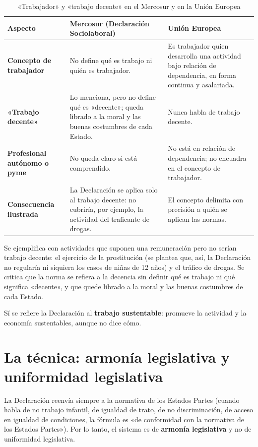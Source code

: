 \documentclass[12pt,oneside]{book}
\begin{document}
\begin{table}[H]
\centering
\small
\renewcommand{\arraystretch}{1.25}
\caption{«Trabajador» y «trabajo decente» en el Mercosur y en la Unión Europea}
\begin{tabularx}{\textwidth}{L{0.20\textwidth}YY}
\toprule
\textbf{Aspecto} & \textbf{Mercosur (Declaración Sociolaboral)} & \textbf{Unión Europea} \\
\midrule
\textbf{Concepto de trabajador} & No define qué es trabajo ni quién es trabajador. & Es trabajador quien desarrolla una actividad bajo relación de dependencia, en forma continua y asalariada. \\
\textbf{«Trabajo decente»} & Lo menciona, pero no define qué es «decente»; queda librado a la moral y las buenas costumbres de cada Estado. & Nunca habla de trabajo decente. \\
\textbf{Profesional autónomo o pyme} & No queda claro si está comprendido. & No está en relación de dependencia; no encuadra en el concepto de trabajador. \\
\textbf{Consecuencia ilustrada} & La Declaración se aplica solo al trabajo decente: no cubriría, por ejemplo, la actividad del traficante de drogas. & El concepto delimita con precisión a quién se aplican las normas. \\
\bottomrule
\end{tabularx}
\end{table}

Se ejemplifica con actividades que suponen una remuneración pero no serían trabajo decente: el ejercicio de la prostitución (se plantea que, así, la Declaración no regularía ni siquiera los casos de niñas de 12 años) y el tráfico de drogas. Se critica que la norma se refiera a la decencia sin definir qué es trabajo ni qué significa «decente», y que quede librado a la moral y las buenas costumbres de cada Estado.

Sí se refiere la Declaración al \textbf{trabajo sustentable}: promueve la actividad y la economía sustentables, aunque no dice cómo.

\section{La técnica: armonía legislativa y uniformidad legislativa}

La Declaración reenvía siempre a la normativa de los Estados Partes (cuando habla de no trabajo infantil, de igualdad de trato, de no discriminación, de acceso en igualdad de condiciones, la fórmula es «de conformidad con la normativa de los Estados Partes»). Por lo tanto, el sistema es de \textbf{armonía legislativa} y no de uniformidad legislativa.
\end{document}
